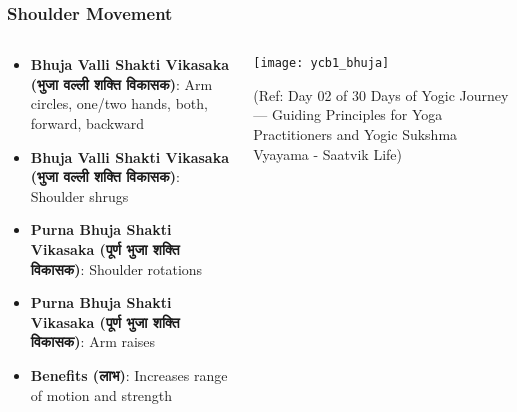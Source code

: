 \begin{frame}[fragile]\frametitle{Shoulder Movement}
\begin{columns}
    \begin{column}[T]{0.5\linewidth}
      \begin{itemize}
		\item \textbf{Bhuja Valli Shakti Vikasaka (भुजा वल्ली शक्ति विकासक)}: Arm circles, one/two hands, both,  forward, backward
		\item \textbf{Bhuja Valli Shakti Vikasaka (भुजा वल्ली शक्ति विकासक)}: Shoulder shrugs
		\item \textbf{Purna Bhuja Shakti Vikasaka (पूर्ण भुजा शक्ति विकासक)}: Shoulder rotations
		\item \textbf{Purna Bhuja Shakti Vikasaka (पूर्ण भुजा शक्ति विकासक)}: Arm raises
		\item \textbf{Benefits (लाभ)}: Increases range of motion and strength
	  \end{itemize}
    \end{column}
    \begin{column}[T]{0.5\linewidth}
		\begin{center}
		        \texttt{[image: ycb1\_bhuja]}
				
				{\tiny (Ref: Day 02 of 30 Days of Yogic Journey — Guiding Principles for Yoga Practitioners and Yogic Sukshma Vyayama - Saatvik Life)}		
		\end{center}	
    \end{column}
\end{columns}
\end{frame}


